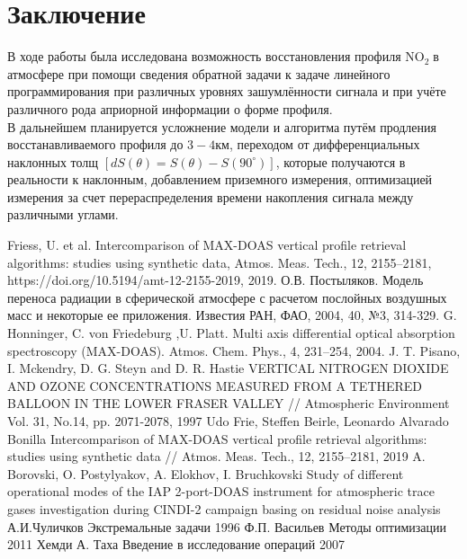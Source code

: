 \documentclass[a4paper,14pt]{article}
\theoremstyle{plain}
\theoremstyle{definition}
\theoremstyle{remark}
\newcommand{\nl}{\\ \indent}
\newcommand{\no}{$\text{NO}_2 \;$}
\begin{document}
\section{Заключение}
В ходе работы была исследована возможность восстановления
профиля \no в атмосфере при помощи сведения обратной задачи к 
задаче линейного программирования при различных уровнях
зашумлённости сигнала и при учёте различного рода априорной
информации о форме профиля.
\nl 
В дальнейшем планируется усложнение модели и алгоритма 
путём продления восстанавливаемого профиля до $3-4\text{км}$,
переходом от дифференциальных наклонных толщ
$[dS(\theta) = S(\theta) - S(90^{\circ})]$, 
которые получаются в реальности к наклонным, добавлением
приземного измерения, оптимизацией измерения за 
счет перераспределения времени накопления сигнала между
различными углами.
\newpage
{}
\begin{thebibliography}{}
    Friess, U. et al. Intercomparison of 
    MAX-DOAS vertical profile retrieval algorithms: 
    studies using synthetic data, Atmos. Meas. Tech., 12, 
    2155–2181, https://doi.org/10.5194/amt-12-2155-2019, 2019.
      О.В. Постыляков. Модель переноса 
    радиации в сферической атмосфере с расчетом послойных
    воздушных масс и некоторые ее приложения. 
    Известия РАН, ФАО, 2004, 40, №3, 314-329.
      G. Honninger, C. von Friedeburg
,U. Platt. Multi axis differential optical absorption
spectroscopy (MAX-DOAS). Atmos. Chem. Phys., 4, 231–254, 2004.
	 J. T. Pisano, I. Mckendry, D. G. Steyn 
and D. R. Hastie VERTICAL NITROGEN DIOXIDE AND OZONE
CONCENTRATIONS MEASURED FROM A TETHERED BALLOON IN THE LOWER
FRASER VALLEY // Atmospheric Environment Vol. 31, No.14, pp.
2071-2078, 1997
	 Udo Frie, Steffen Beirle, Leonardo
Alvarado Bonilla Intercomparison of MAX-DOAS vertical profile
retrieval algorithms: studies using synthetic data // Atmos.
Meas. Tech., 12, 2155–2181, 2019
	 A. Borovski, O. Postylyakov, A. Elokhov,
I. Bruchkovski Study of different operational modes of the 
IAP 2-port-DOAS instrument for atmospheric trace gases
investigation during CINDI-2 campaign basing on residual 
noise analysis
	 А.И.Чуличков Экстремальные задачи 1996
	 Ф.П. Васильев Методы оптимизации 2011
	 Хемди А. Таха Введение в исследование операций 2007
\end{thebibliography}
\end{document}
